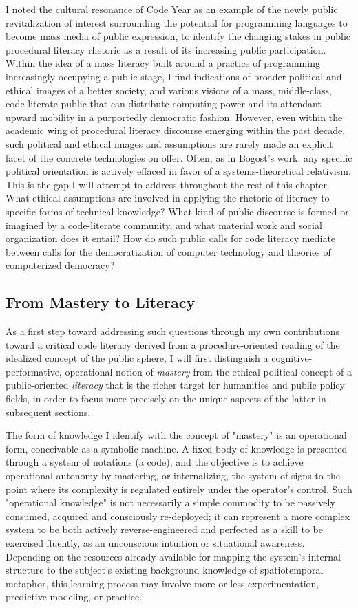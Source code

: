 I noted the cultural resonance of Code Year as an example of the newly public revitalization of interest surrounding the potential for programming languages to become mass media of public expression, to identify the changing stakes in public procedural literacy rhetoric as a result of its increasing public participation. Within the idea of a mass literacy built around a practice of programming increasingly occupying a public stage, I find indications of broader political and ethical images of a better society, and various visions of a mass, middle-class, code-literate public that can distribute computing power and its attendant upward mobility in a purportedly democratic fashion. However, even within the academic wing of procedural literacy discourse emerging within the past decade, such political and ethical images and assumptions are rarely made an explicit facet of the concrete technologies on offer. Often, as in Bogost's work, any specific political orientation is actively effaced in favor of a systems-theoretical relativism. This is the gap I will attempt to address throughout the rest of this chapter. What ethical assumptions are involved in applying the rhetoric of literacy to specific forms of technical knowledge? What kind of public discourse is formed or imagined by a code-literate community, and what material work and social organization does it entail? How do such public calls for code literacy mediate between calls for the democratization of computer technology and theories of computerized democracy?

\subsection*{From Mastery to Literacy}
As a first step toward addressing such questions through my own contributions toward a critical code literacy derived from a procedure-oriented reading of the idealized concept of the public sphere, I will first distinguish a cognitive-performative, operational notion of \emph{mastery} from the ethical-political concept of a public-oriented \emph{literacy} that is the richer target for humanities and public policy fields, in order to focus more precisely on the unique aspects of the latter in subsequent sections.

The form of knowledge I identify with the concept of "mastery" is an operational form, conceivable as a symbolic machine. A fixed body of knowledge is presented through a system of notations (a code), and the objective is to achieve operational autonomy by mastering, or internalizing, the system of signs to the point where its complexity is regulated entirely under the operator's control. Such "operational knowledge" is not necessarily a simple commodity to be passively consumed, acquired and consciously re-deployed; it can represent a more complex system to be both actively reverse-engineered and perfected as a skill to be exercised fluently, as an unconscious intuition or situational awareness. Depending on the resources already available for mapping the system's internal structure to the subject's existing background knowledge of spatiotemporal metaphor, this learning process may involve more or less experimentation, predictive modeling, or practice.

